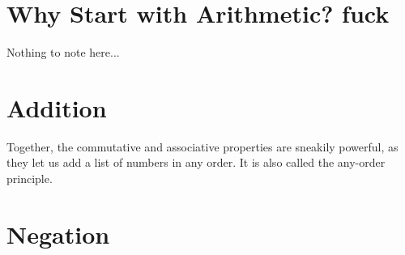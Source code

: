 \documentclass[../master.tex]{subfiles}
\begin{document}
\section{Why Start with Arithmetic? fuck}
Nothing to note here...

\section{Addition}
Together, the commutative and associative properties are sneakily powerful, as they let us add a list of numbers in any order. It is also called the  any-order principle.


\section{Negation}
\end{document}
